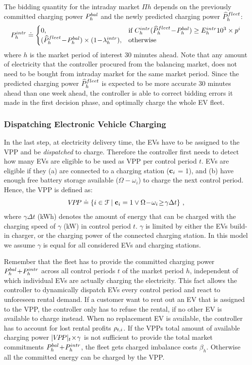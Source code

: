 \documentclass[a4paper, 12pt]{article}
\begin{document}
The bidding quantity for the intraday market \(\Pi{h}\) depends on the previously
committed charging power \(P^{bal}_{h}\) and the newly predicted charging power
\(\widehat{P}^{fleet}_{h}\):
\begin{equation} \label{eq-model-pi}
  P^{intr}_{h} \doteq
  \begin{cases}
    0, & \text{if}\ C^{intr}_{h}(\widehat{P}^{fleet}_{h}\!-\!P^{bal}_{h}) \geq E^{intr}_{h}10^3 \times p^{i}\\
    (\widehat{P}^{fleet}_{h}\!-\!P^{bal}_{h}) \times (1\!-\!\lambda^{intr}_{h}), & \text{otherwise}
  \end{cases}
\end{equation}
where \(h\) is the market period of interest 30 minutes ahead. Note that any
amount of electricity that the controller procured from the balancing market,
does not need to be bought from intraday market for the same market period.
Since the predicted charging power \(\widehat{P}^{fleet}_{h}\) is expected to be more
accurate 30 minutes ahead than one week ahead, the controller is able to correct
bidding errors it made in the first decision phase, and optimally charge the
whole EV fleet.

\subsubsection{Dispatching Electronic Vehicle Charging}
\label{sec:orgb5b342a}
In the last step, at electricity delivery time, the EVs have to be assigned to
the VPP and be \emph{dispatched} to charge. Therefore the controller first needs to
detect how many EVs are eligible to be used as VPP per control period \(t\). EVs
are eligible if they (a) are connected to a charging station (\({\bf{c}}_{i}\) = 1), and (b)
have enough free battery storage available (\(\Omega\!-\!\omega_{i}\)) to charge
the next control period. Hence, the VPP is defined as:
\begin{equation}
    V\!P\!P \doteq \{i\in{\cal{F}} \;|\; {\bf{c}}_{i} = 1 \vee \Omega\!-\!\omega_{i}\!\geq\!\gamma\Delta{t}\} \text{ ,}
\end{equation}
where \(\gamma\Delta{t}\) (kWh) denotes the amount of energy that can be charged
with the charging speed of \(\gamma\) (kW) in control period \(t\). \(\gamma\) is
limited by either the EVs build-in charger, or the charging power of the
connected charging station. In this model we assume \(\gamma\) is equal for all
considered EVs and charging stations.

Remember that the fleet has to provide the committed charging power
\(P^{bal}_{h}\!+\!P^{intr}_{h}\) across all control periods \(t\) of the market period \(h\),
independent of which individual EVs are actually charging the electricity. This
fact allows the controller to dynamically dispatch EVs every control period and
react to unforeseen rental demand. If a customer want to rent out an EV that is
assigned to the VPP, the controller only has to refuse the rental, if no other
EV is available to charge instead. When no replacement EV is available, the
controller has to account for lost rental profits \(\rho_{t,i}\). If the VPPs total
amount of available charging power \(|{V\!P\!P}|_{t}\!\times\!\gamma\) is not sufficient to
provide the total market commitments \(P^{bal}_{h}\!+\!P^{intr}_{h}\), the fleet gets charged
imbalance costs \(\beta_{h}\). Otherwise all the committed energy can be charged
by the VPP.
\end{document}
